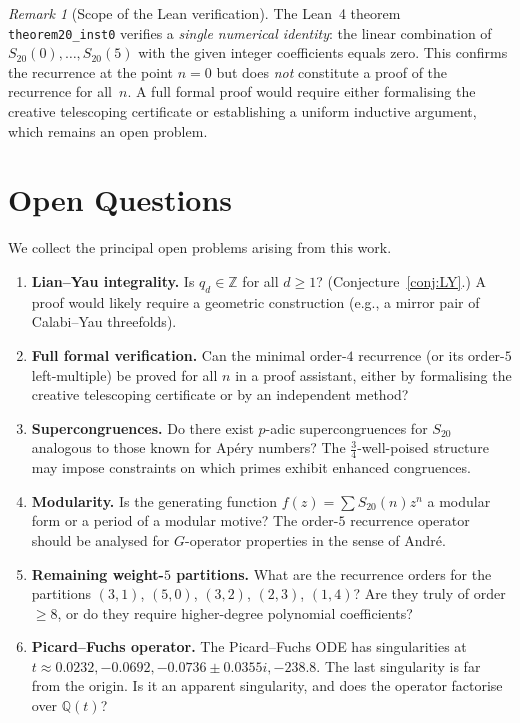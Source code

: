 \documentclass[12pt,reqno]{amsart}
\theoremstyle{plain}
\theoremstyle{definition}
\theoremstyle{remark}
\newtheorem{remark}[theorem]{Remark}
\newcommand{\ZZ}{\mathbb{Z}}
\newcommand{\QQ}{\mathbb{Q}}
\begin{document}
\begin{remark}[Scope of the Lean verification]\label{rem:lean_scope}
The Lean~4 theorem \texttt{theorem20\_inst0} verifies a
\emph{single numerical identity}: the linear combination of
$S_{20}(0), \ldots, S_{20}(5)$ with the given integer
coefficients equals zero.
This confirms the recurrence at the point $n = 0$ but does
\emph{not} constitute a proof of the recurrence for all~$n$.
A full formal proof would require either formalising the
creative telescoping certificate or establishing a uniform
inductive argument, which remains an open problem.
\end{remark}


\section{Open Questions}\label{sec:open}

We collect the principal open problems arising from this work.

\begin{enumerate}
\item \textbf{Lian--Yau integrality.}
Is $q_d \in \ZZ$ for all $d \ge 1$?
(Conjecture~\ref{conj:LY}.)
A proof would likely require a geometric construction
(e.g., a mirror pair of Calabi--Yau threefolds).

\item \textbf{Full formal verification.}
Can the minimal order-$4$ recurrence (or its order-$5$ left-multiple) be proved for all $n$ in a
proof assistant, either by formalising the creative
telescoping certificate or by an independent method?

\item \textbf{Supercongruences.}
Do there exist $p$-adic supercongruences for $S_{20}$
analogous to those known for Ap\'ery numbers?
The $\tfrac{3}{4}$-well-poised structure may impose
constraints on which primes exhibit enhanced congruences.

\item \textbf{Modularity.}
Is the generating function $f(z) = \sum S_{20}(n) z^n$
a modular form or a period of a modular motive?
The order-$5$ recurrence operator should be analysed for
$G$-operator properties in the sense of Andr\'e.

\item \textbf{Remaining weight-$5$ partitions.}
What are the recurrence orders for the partitions
$(3,1)$, $(5,0)$, $(3,2)$, $(2,3)$, $(1,4)$?
Are they truly of order $\ge 8$, or do they require
higher-degree polynomial coefficients?

\item \textbf{Picard--Fuchs operator.}
The Picard--Fuchs ODE has singularities at
$t \approx 0.0232, -0.0692, -0.0736 \pm 0.0355i, -238.8$.
The last singularity is far from the origin.
Is it an apparent singularity, and does the operator
factorise over $\QQ(t)$?
\end{enumerate}
\end{document}
